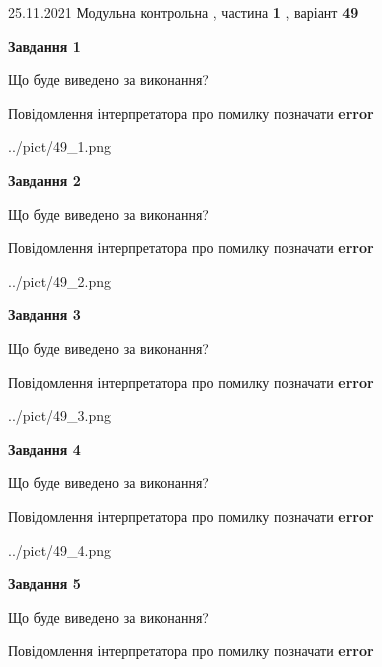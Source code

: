 \documentclass[10pt, ukrainian]{article}
\begin{document}
{25.11.2021 Модульна контрольна , частина \textbf { 1 }, варіант  \No \textbf { 49 }\par}
{
\begin {large}

{\begin {center}\textbf{Завдання 1}\end {center}}\par
Що буде виведено за виконання? \par
Повідомлення інтерпретатора про помилку позначати \textbf{error}

\begin{center}
	{../pict/49_1.png}
\end{center}
\newpage

{\begin {center}\textbf{Завдання 2}\end {center}}\par
Що буде виведено за виконання? \par
Повідомлення інтерпретатора про помилку позначати \textbf{error}

\begin{center}
	{../pict/49_2.png}
\end{center}
\newpage

{\begin {center}\textbf{Завдання 3}\end {center}}\par
Що буде виведено за виконання? \par
Повідомлення інтерпретатора про помилку позначати \textbf{error}

\begin{center}
	{../pict/49_3.png}
\end{center}
\newpage

{\begin {center}\textbf{Завдання 4}\end {center}}\par
Що буде виведено за виконання? \par
Повідомлення інтерпретатора про помилку позначати \textbf{error}

\begin{center}
	{../pict/49_4.png}
\end{center}
\newpage

{\begin {center}\textbf{Завдання 5}\end {center}}\par
Що буде виведено за виконання? \par
Повідомлення інтерпретатора про помилку позначати \textbf{error}


\end{large}}
\end{document}
